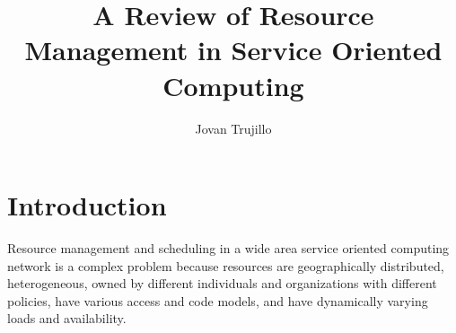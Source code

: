 \documentclass{article}
\title{A Review of Resource Management in Service Oriented Computing}
\author{Jovan Trujillo}
\date{\currenttime}
\begin{document}
\maketitle

\section{Introduction}
Resource management and scheduling in a wide area service oriented computing network is a complex problem because resources are geographically distributed, heterogeneous, owned by different individuals and organizations with different policies, have various access and code models, and have dynamically varying loads and availability.\citep{economygrid} 



\end{document}
